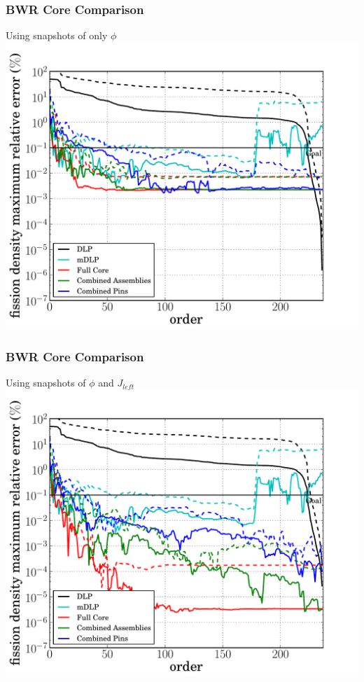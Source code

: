 \documentclass[fleqn]{beamer}
\begin{document}
  \begin{frame}[noframenumbering]
    \frametitle{BWR Core Comparison}
    \begin{center}
    Using snapshots of only $\phi$
    \includegraphics[trim=.1cm .25cm 2.0cm .4cm, clip=true, totalheight=.8\textheight]{BWR_energy_basis_comparison_fission-238}
    \end{center}
  \end{frame}

  \begin{frame}[noframenumbering]
    \frametitle{BWR Core Comparison}
    \begin{center}
    Using snapshots of $\phi$ and $J_{left}$
    \includegraphics[trim=.1cm .25cm 2.0cm .4cm, clip=true, totalheight=.8\textheight]{BWRpartial_energy_basis_comparison_fission-238}
    \end{center}
  \end{frame}

  \backupend
\end{document}
